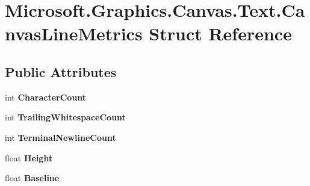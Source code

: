 \hypertarget{struct_microsoft_1_1_graphics_1_1_canvas_1_1_text_1_1_canvas_line_metrics}{}\section{Microsoft.\+Graphics.\+Canvas.\+Text.\+Canvas\+Line\+Metrics Struct Reference}
\label{struct_microsoft_1_1_graphics_1_1_canvas_1_1_text_1_1_canvas_line_metrics}
\subsection*{Public Attributes}
\begin{DoxyCompactItemize}
\item 
\mbox{\label{struct_microsoft_1_1_graphics_1_1_canvas_1_1_text_1_1_canvas_line_metrics_ac0f0eeac51c02ecff080fef78a4b4eb4}} 
int {\bfseries Character\+Count}
\item 
\mbox{\label{struct_microsoft_1_1_graphics_1_1_canvas_1_1_text_1_1_canvas_line_metrics_a4cd7912290197050998c35dc84d36a43}} 
int {\bfseries Trailing\+Whitespace\+Count}
\item 
\mbox{\label{struct_microsoft_1_1_graphics_1_1_canvas_1_1_text_1_1_canvas_line_metrics_a0138db94858da5767ff0b060c6a82ce4}} 
int {\bfseries Terminal\+Newline\+Count}
\item 
\mbox{\label{struct_microsoft_1_1_graphics_1_1_canvas_1_1_text_1_1_canvas_line_metrics_a85184729f6ffbd558bcc50cedcc11938}} 
float {\bfseries Height}
\item 
\mbox{\label{struct_microsoft_1_1_graphics_1_1_canvas_1_1_text_1_1_canvas_line_metrics_a5c23f878cd3be38364abcc60a418b426}} 
float {\bfseries Baseline}
\item 
\mbox{\label{struct_microsoft_1_1_graphics_1_1_canvas_1_1_text_1_1_canvas_line_metrics_a3ed098b5e17a4e16c2f3e9148ed602c0}} 

\end{DoxyCompactItemize}
